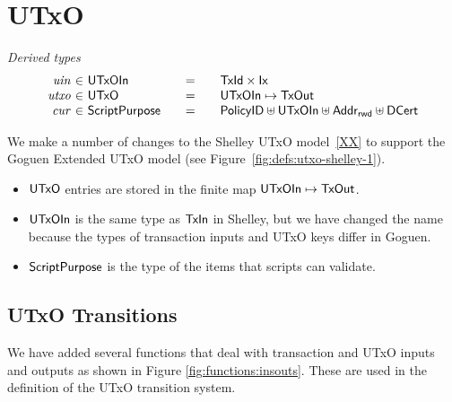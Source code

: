 \section{UTxO}
\label{sec:utxo}


\begin{figure*}[htb]
  \emph{Derived types}
  \begin{equation*}
    \begin{array}{r@{~\in~}l@{\qquad=\qquad}lr}
      \var{uin}
      & \UTxOIn
      & \TxId \times \Ix
      \\
      \var{utxo}
      & \UTxO
      & \UTxOIn \mapsto \TxOut
      \\
      \var{cur}
      & \ScriptPurpose
      & \PolicyID \uniondistinct \UTxOIn \uniondistinct \AddrRWD \uniondistinct \DCert
    \end{array}
  \end{equation*}
  \caption{Definitions used in the UTxO transition system}
  \label{fig:defs:utxo-shelley-1}
\end{figure*}


We make a number of changes to the Shelley UTxO model~\ref{XX} to support the Goguen Extended UTxO model
(see Figure~\ref{fig:defs:utxo-shelley-1}).

\begin{itemize}
\item
  $\mathsf{UTxO}$ entries are stored in the finite map $\mathsf{UTxOIn} \mapsto \mathsf{TxOut}$.

\item
  $\mathsf{UTxOIn}$ is the same type as $\mathsf{TxIn}$ in Shelley, but we have changed
  the name because the types of transaction inputs and UTxO keys
  differ in Goguen.

\item
  $\mathsf{ScriptPurpose}$ is the type of the items that scripts can validate.

\end{itemize}

\subsection{UTxO Transitions}
\label{sec:utxo-trans}

We have added several functions that deal with transaction and UTxO inputs and
outputs as shown in Figure \ref{fig:functions:insouts}. These are used in the definition of the UTxO transition system.

